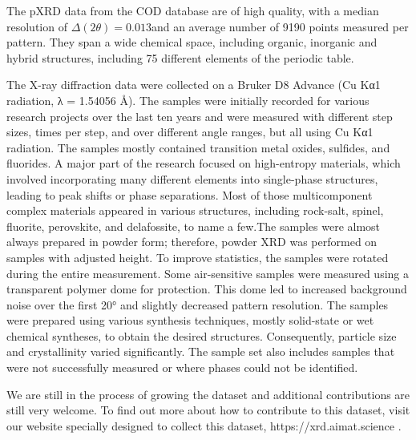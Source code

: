 The pXRD data from the COD database are of high quality, with a median resolution of $\Delta(2\theta) = 0.013$\textdegree and an average number of 9190 points measured per pattern. They span a wide chemical space, including organic, inorganic and hybrid structures, including 75 different elements of the periodic table.



The X-ray diffraction data were collected on a Bruker D8 Advance (Cu Kα1 radiation, λ = 1.54056 Å). The samples were initially recorded for various research projects over the last ten years and were measured with different step sizes, times per step, and over different angle ranges, but all using Cu Kα1 radiation. The samples mostly contained transition metal oxides, sulfides, and fluorides. A major part of the research focused on high-entropy materials, which involved incorporating many different elements into single-phase structures, leading to peak shifts or phase separations. Most of those multicomponent complex materials appeared in various structures, including rock-salt, spinel, fluorite, perovskite, and delafossite, to name a few.The samples were almost always prepared in powder form; therefore, powder XRD was performed on samples with adjusted height. To improve statistics, the samples were rotated during the entire measurement. Some air-sensitive samples were measured using a transparent polymer dome for protection. This dome led to increased background noise over the first 20° and slightly decreased pattern resolution. The samples were prepared using various synthesis techniques, mostly solid-state or wet chemical syntheses, to obtain the desired structures. Consequently, particle size and crystallinity varied significantly. The sample set also includes samples that were not successfully measured or where phases could not be identified. 


We are still in the process of growing the dataset and additional contributions are still very welcome. To find out more about how to contribute to this dataset, visit our website specially designed to collect this dataset, https://xrd.aimat.science .